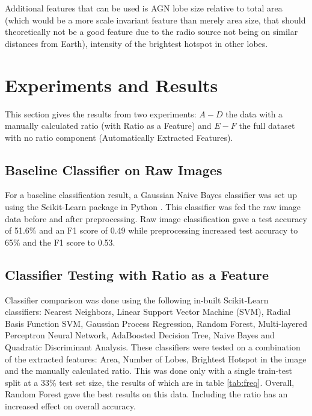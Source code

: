 \documentclass[conference]{IEEEtran}
\begin{document}
Additional features that can be used is AGN lobe size relative to total area (which would be a more scale invariant feature than merely area size, that should theoretically not be a good feature due to the radio source not being on similar distances from Earth), intensity of the brightest hotspot in other lobes.

\section{Experiments and Results}

This section gives the results from two experiments: $A-D$ the data with a manually calculated ratio (with Ratio as a Feature) and $E-F$ the full dataset with no ratio component (Automatically Extracted Features).

\subsection{Baseline Classifier on Raw Images}

For a baseline classification result, a Gaussian Naive Bayes classifier was set up using the Scikit-Learn package in Python \cite{scikit-learn}. This classifier was fed the raw image data before and after preprocessing. Raw image classification gave a test accuracy of 51.6\% and an F1 score of 0.49 while preprocessing increased test accuracy to 65\% and the F1 score to 0.53. 

\subsection{Classifier Testing with Ratio as a Feature}

Classifier comparison was done using the following in-built Scikit-Learn classifiers: Nearest Neighbors, Linear Support Vector Machine (SVM), Radial Basis Function SVM, Gaussian Process Regression, Random Forest, Multi-layered Perceptron Neural Network, AdaBoosted Decision Tree, Naive Bayes and Quadratic Discriminant Analysis. These classifiers were tested on a combination of the extracted features: Area, Number of Lobes, Brightest Hotspot in the image and the manually calculated ratio. This was done only with a single train-test split at a 33\% test set size, the results of which are in table \ref{tab:freq}. Overall, Random Forest gave the best results on this data. Including the ratio has an increased effect on overall accuracy.
\end{document}
